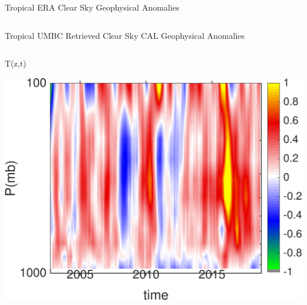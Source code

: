 \documentclass[10pt,t]{beamer}
\begin{document}
\begin{frame}{Tropical ERA Clear Sky Geophysical Anomalies}
\begin{columns}
\begin{column}{0.45\columnwidth}

\end{column}
\end{columns}
\end{frame}


\begin{frame}{Tropical UMBC Retrieved Clear Sky CAL Geophysical Anomalies}
\vspace{-0.35in}

\begin{columns}
\begin{column}{0.45\columnwidth}
\begin{block}{\footnotesize T(z,t)}
\vspace{-0.1in}
\begin{center}
\includegraphics[width=\linewidth]{Figs/ClearAnom/umbc_clr_retr_cal_ptemp_anom_200209_201808.png}
\end{center}
\end{block}
\end{column}


\end{columns}
\end{frame}
\end{document}
